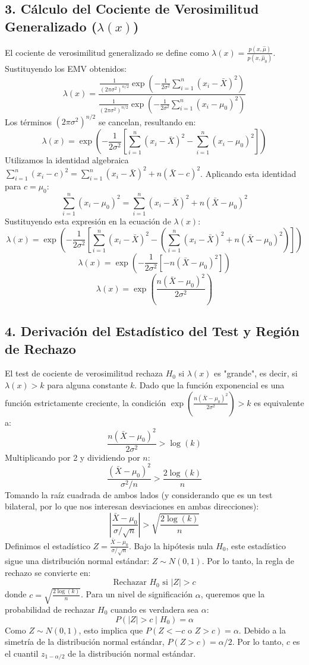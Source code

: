 \documentclass{article}
\begin{document}
\subsection*{3. Cálculo del Cociente de Verosimilitud Generalizado ($\lambda(x)$)}
El cociente de verosimilitud generalizado se define como $\lambda(x) = \frac{p(x, \hat{\mu})}{p(x, \hat{\mu}_0)}$. Sustituyendo los EMV obtenidos:
$$ \lambda(x) = \frac{\frac{1}{(2\pi\sigma^2)^{n/2}} \exp\left(-\frac{1}{2\sigma^2} \sum_{i=1}^n (x_i - \bar{X})^2\right)}{\frac{1}{(2\pi\sigma^2)^{n/2}} \exp\left(-\frac{1}{2\sigma^2} \sum_{i=1}^n (x_i - \mu_0)^2\right)} $$
Los términos $(2\pi\sigma^2)^{n/2}$ se cancelan, resultando en:
$$ \lambda(x) = \exp\left(-\frac{1}{2\sigma^2} \left[ \sum_{i=1}^n (x_i - \bar{X})^2 - \sum_{i=1}^n (x_i - \mu_0)^2 \right]\right) $$
Utilizamos la identidad algebraica $\sum_{i=1}^n (x_i - c)^2 = \sum_{i=1}^n (x_i - \bar{X})^2 + n(\bar{X} - c)^2$. Aplicando esta identidad para $c = \mu_0$:
$$ \sum_{i=1}^n (x_i - \mu_0)^2 = \sum_{i=1}^n (x_i - \bar{X})^2 + n(\bar{X} - \mu_0)^2 $$
Sustituyendo esta expresión en la ecuación de $\lambda(x)$:
$$ \lambda(x) = \exp\left(-\frac{1}{2\sigma^2} \left[ \sum_{i=1}^n (x_i - \bar{X})^2 - \left( \sum_{i=1}^n (x_i - \bar{X})^2 + n(\bar{X} - \mu_0)^2 \right) \right]\right) $$
$$ \lambda(x) = \exp\left(-\frac{1}{2\sigma^2} \left[ -n(\bar{X} - \mu_0)^2 \right]\right) $$
$$ \lambda(x) = \exp\left(\frac{n(\bar{X} - \mu_0)^2}{2\sigma^2}\right) $$

\subsection*{4. Derivación del Estadístico del Test y Región de Rechazo}
El test de cociente de verosimilitud rechaza $H_0$ si $\lambda(x)$ es "grande", es decir, si $\lambda(x) > k$ para alguna constante $k$.
Dado que la función exponencial es una función estrictamente creciente, la condición $\exp\left(\frac{n(\bar{X} - \mu_0)^2}{2\sigma^2}\right) > k$ es equivalente a:
$$ \frac{n(\bar{X} - \mu_0)^2}{2\sigma^2} > \log(k) $$
Multiplicando por 2 y dividiendo por $n$:
$$ \frac{(\bar{X} - \mu_0)^2}{\sigma^2/n} > \frac{2\log(k)}{n} $$
Tomando la raíz cuadrada de ambos lados (y considerando que es un test bilateral, por lo que nos interesan desviaciones en ambas direcciones):
$$ \left|\frac{\bar{X} - \mu_0}{\sigma/\sqrt{n}}\right| > \sqrt{\frac{2\log(k)}{n}} $$
Definimos el estadístico $Z = \frac{\bar{X} - \mu_0}{\sigma/\sqrt{n}}$. Bajo la hipótesis nula $H_0$, este estadístico sigue una distribución normal estándar: $Z \sim N(0,1)$.
Por lo tanto, la regla de rechazo se convierte en:
$$ \text{Rechazar } H_0 \text{ si } |Z| > c $$
donde $c = \sqrt{\frac{2\log(k)}{n}}$. Para un nivel de significación $\alpha$, queremos que la probabilidad de rechazar $H_0$ cuando es verdadera sea $\alpha$:
$$ P(|Z| > c \mid H_0) = \alpha $$
Como $Z \sim N(0,1)$, esto implica que $P(Z < -c \text{ o } Z > c) = \alpha$. Debido a la simetría de la distribución normal estándar, $P(Z > c) = \alpha/2$.
Por lo tanto, $c$ es el cuantil $z_{1-\alpha/2}$ de la distribución normal estándar.
\end{document}
